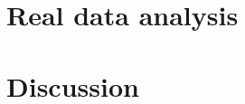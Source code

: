\documentclass[12pt]{article}
\begin{document}
\section{Real data analysis}




\section{Discussion}


\newpage

\end{document}
